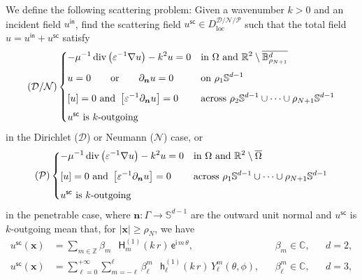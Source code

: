 \documentclass[12pt,a4paper]{article}
\theoremstyle{definition}
\theoremstyle{plain}
\theoremstyle{remark}
\newcommand{\bbB}{\mathbb{B}}
\newcommand{\bbC}{\mathbb{C}}
\newcommand{\bbR}{\mathbb{R}}
\newcommand{\bbS}{\mathbb{S}}
\newcommand{\bbZ}{\mathbb{Z}}
\newcommand{\calD}{\mathcal{D}}
\newcommand{\calN}{\mathcal{N}}
\newcommand{\calP}{\mathcal{P}}
\newcommand{\ex}{\mathsf{e}}
\newcommand{\im}{\mathsf{i}}
\newcommand{\Hu}{\mathop{}\!\mathsf{H}^{(1)}}
\newcommand{\hu}{\mathop{}\!\mathsf{h}^{(1)}}
\DeclareMathOperator{\Div}{div}
\newcommand{\plr}[1]{\left(#1\right)}
\newcommand{\clr}[1]{\left[#1\right]}
\newcommand{\vect}[1]{\boldsymbol{#1}}
\newcommand{\vx}{\boldsymbol{x}}
\newcommand{\eps}{\varepsilon}
\newcommand{\loc}{\mathrm{loc}}
\newcommand{\inc}{\mathsf{in}}
\newcommand{\sca}{\mathsf{sc}}
\begin{document}
We define the following scattering problem: Given a wavenumber $k > 0$ and an incident field $u^\inc$, find the scattering field $u^\sca \in D_\loc^{\calD/\calN/\calP}$ such that the total field $u = u^\inc + u^\sca$ satisfy
\begin{equation}\label{eq:scat_pde_im}
    (\calD / \calN)\begin{dcases}
        -\mu^{-1}\Div\plr{\eps^{-1} \nabla u} - k^2 u = 0                   & \text{in } \Omega \text{ and } \bbR^2 \setminus \overline{\bbB_{\rho_{N+1}}^d} \\[1ex]
        u = 0 \qquad \text{or} \qquad \partial_{\vect{n}}u = 0              & \text{on } \rho_1\bbS^{d-1}                                                    \\[1ex]
        \clr{u} = 0 \ \text{and}\ \clr{\eps^{-1} \partial_{\vect{n}} u} = 0 & \text{across } \rho_2\bbS^{d-1} \cup \cdots \cup \rho_{N+1}\bbS^{d-1}          \\[1ex]
        \text{$u^\sca$ is $k$-outgoing}
    \end{dcases}
\end{equation}
in the Dirichlet ($\calD$) or Neumann ($\calN$) case, or
\begin{equation}\label{eq:scat_pde}
    (\calP)\begin{dcases}
        -\mu^{-1}\Div\plr{\eps^{-1} \nabla u} - k^2 u = 0                   & \text{in } \Omega \text{ and } \bbR^2 \setminus \overline{\Omega}     \\[1ex]
        \clr{u} = 0 \ \text{and}\ \clr{\eps^{-1} \partial_{\vect{n}} u} = 0 & \text{across } \rho_1\bbS^{d-1} \cup \cdots \cup \rho_{N+1}\bbS^{d-1} \\[1ex]
        \text{$u^\sca$ is $k$-outgoing}
    \end{dcases}
\end{equation}
in the penetrable case, where $\vect{n} : \Gamma \to \bbS^{d-1}$ are the outward unit normal and $u^\sca$ is $k$-outgoing mean that, for $|\vx| \ge \rho_N$, we have
\begin{subequations}\label{eq:OWC}
    \begin{align}
        u^\sca(\vx)
         & = \sum_{m \in \bbZ} \beta_m\, \Hu_m(k\, r)\, \ex^{\im\, m\, \theta},
         &                                                                                                           & \beta_m \in \bbC,
         &                                                                                                           & d = 2,                 \\
        u^\sca(\vx)
         & = \sum_{\ell = 0}^{+\infty} \sum_{m = -\ell}^\ell \beta_\ell^m\, \hu_\ell(k\, r)\, Y_\ell^m(\theta,\phi),
         &                                                                                                           & \beta_\ell^m \in \bbC,
         &                                                                                                           & d = 3,
    \end{align}
\end{subequations}
\end{document}
